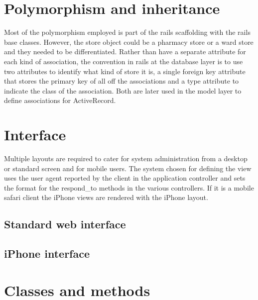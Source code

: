 \documentclass[letterpaper]{amsart}
\begin{document}
\section{Polymorphism and inheritance}
Most of the polymorphism employed is part of the rails scaffolding with the rails base classes.  However, the store object could be a pharmacy store or a ward store and they needed to be differentiated.  Rather than have a separate attribute for each kind of association, the convention in rails at the database layer is to use two attributes to identify what kind of store it is, a single foreign key attribute that stores the primary key of all off the associations and a type attribute to indicate the class of the association.  Both are later used in the model layer to define associations for ActiveRecord.
\section{Interface}
Multiple layouts are required to cater for system administration from a desktop or standard screen and for mobile users.  The system chosen for defining the view uses the user agent reported by the client in the application controller and sets the format for the respond\_to methods in the various controllers.  If it is a mobile safari client the iPhone views are rendered with the iPhone layout.  
\subsection{Standard web interface}
\subsection{iPhone interface}
\section{Classes and methods}
\end{document}
